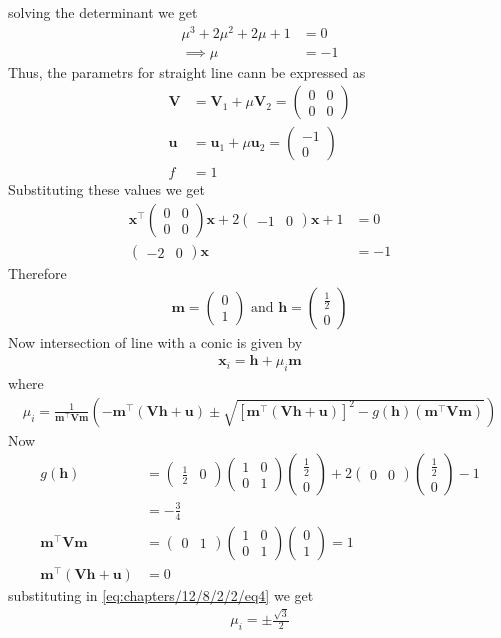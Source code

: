 \documentclass[12pt]{article}
\providecommand{\sbrak}[1]{\ensuremath{{}\left[#1\right]}}
\providecommand{\brak}[1]{\ensuremath{\left(#1\right)}}
\newcommand{\myvec}[1]{\ensuremath{\begin{pmatrix}#1\end{pmatrix}}}
\let\vec\mathbf
\begin{document}
solving the determinant we get
\begin{align}
	\mu^3+2\mu^2+2\mu+1&=0\\
	\implies \mu &= -1
\end{align}
Thus, the parametrs for straight line cann be expressed as
\begin{align}
	\vec{V} &= \vec{V}_1+\mu\vec{V}_2 = \myvec{0&0\\0&0}\\
	\vec{u} &= \vec{u}_1+\mu\vec{u}_2 = \myvec{-1\\0}\\
	f &= 1
\end{align}
Substituting these values we get
\begin{align}
	\vec{x}^\top\myvec{0&0\\0&0}\vec{x} + 2\myvec{-1&0}\vec{x} + 1 &= 0\\
	\myvec{-2&0}\vec{x} &= -1 
\end{align}
Therefore
\begin{align}
	\vec{m} = \myvec{0\\1} \text{ and } \vec{h} = \myvec{\frac{1}{2}\\0}
\end{align}
Now intersection of line with a conic is given by
\begin{align}
	\vec{x}_i=\vec{h}+\mu_i\vec{m}
\end{align}
where
\begin{align}
	\label{eq:chapters/12/8/2/2/eq4}
	\mu_i=\frac{1}{\vec{m}^\top\vec{V}\vec{m}}\brak{-\vec{m}^\top\brak{\vec{V}\vec{h}+\vec{u}}\pm\sqrt{\sbrak{\vec{m}^\top\brak{\vec{V}\vec{h}+\vec{u}}}^2-g\brak{\vec{h}}\brak{\vec{m}^\top\vec{V}\vec{m}}}}
\end{align}
Now
\begin{align}
	g\brak{\vec{h}}&=\myvec{\frac{1}{2}&0}\myvec{1&0\\0&1}\myvec{\frac{1}{2}\\0}+2\myvec{0&0}\myvec{\frac{1}{2}\\0}-1\\
	&= -\frac{3}{4}\\
	\vec{m}^\top\vec{V}\vec{m} &= \myvec{0&1}\myvec{1&0\\0&1}\myvec{0\\1} = 1\\
	\vec{m}^\top\brak{\vec{V}\vec{h}+\vec{u}} &= 0
\end{align}
substituting in \eqref{eq:chapters/12/8/2/2/eq4} we get
\begin{align}
	\mu_i = \pm\frac{\sqrt{3}}{2}
\end{align}
\end{document}

